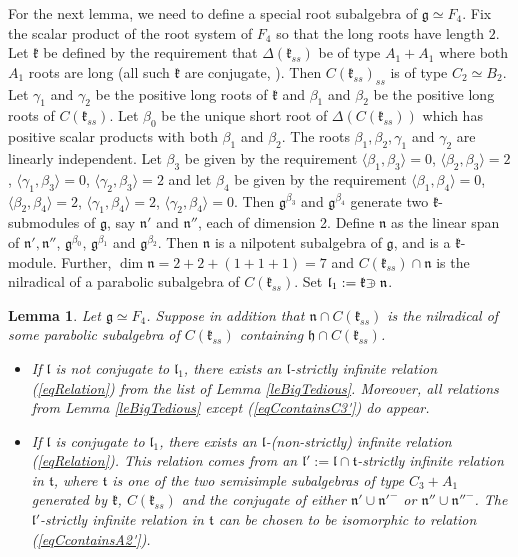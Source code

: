 \documentclass[12pt]{report}
\newtheorem{lemma}[theo]{Lemma}
\newcommand{\tT}{\mathfrak{t}}
\newcommand{\kk}{\mathfrak{k}}
\newcommand{\nn}{\mathfrak{n}}
\newcommand{\hh}{\mathfrak{h}}
\newcommand{\gG}{\mathfrak{g}}
\newcommand{\lL}{\mathfrak{l}}
\newcommand{\refeq}[1]{(\ref{#1})}
\def\crplus{\hbox{$\supset${\raise1.05pt\hbox{\kern -0.60em ${\scriptscriptstyle +}$}}\ }}
\begin{document}
For the next lemma, we need to define a special root subalgebra of $\gG\simeq F_4$. Fix the scalar product of the root system of $F_4$ so that the long roots have length $2$. Let $\kk$ be defined by the requirement that $\Delta(\kk_{ss})$ be of type $A_1+A_1$ where both $A_1$ roots are long (all such $\kk$ are conjugate, \cite{Dynkin:Semisimple}). Then $C(\kk_{ss})_{ss}$ is of type $C_2\simeq B_2$. Let $\gamma_1$ and $\gamma_2$ be the positive long roots of $\kk$ and $\beta_1$ and $\beta_2$ be the positive long roots of $C(\kk_{ss})$. Let $\beta_0$ be the unique short root of $\Delta(C(\kk_{ss}))$ which has positive scalar products with both $\beta_1$ and $\beta_2$. The roots $\beta_1,\beta_2,\gamma_1$ and $\gamma_2$ are linearly independent. Let $\beta_3$ be given by the requirement $\langle\beta_1,\beta_3 \rangle=0$, $\langle \beta_2, \beta_3 \rangle=2$, $\langle \gamma_1, \beta_3\rangle=0$, $\langle\gamma_2,\beta_3 \rangle=2$ and let $\beta_4$ be given by the requirement $\langle\beta_1,\beta_4 \rangle=0$, $\langle\beta_2,\beta_4\rangle=2$, $\langle \gamma_1, \beta_4 \rangle=2$, $\langle\gamma_2,\beta_4 \rangle=0$. Then $\gG^{\beta_3}$ and $\gG^{\beta_4}$ generate two $\kk$-submodules of $\gG$, say $\nn'$ and $\nn''$, each of dimension 2. Define $\nn$ as the linear span of $\nn',\nn''$, $\gG^{\beta_0}$, $\gG^{\beta_1}$ and $\gG^{\beta_2}$. Then $\nn$ is a nilpotent subalgebra of $\gG$, and is a $\kk$-module. Further, $\dim\nn = 2+2+(1+1+1)=7$ and $C(\kk_{ss})\cap\nn$ is the nilradical of a parabolic subalgebra of $C(\kk_{ss})$. Set $\lL_1:=\kk\crplus\nn$.  

\begin{lemma}\label{leF4} Let $\gG\simeq F_4$. Suppose in addition that $\nn \cap C(\kk_{ss})$ is the nilradical of some parabolic subalgebra of $C(\kk_{ss})$ containing $\hh\cap C(\kk_{ss})$.
\begin{itemize}
\item[(a)] If $\lL$ is not conjugate to $\lL_1$, there exists an $\lL$-strictly infinite relation \refeq{eqRelation} from the list of Lemma \ref{leBigTedious}. Moreover, all relations from Lemma \ref{leBigTedious} except (\ref{eqCcontainsC3'}) do appear.
\item[(b)] If $\lL$ is conjugate to $\lL_1$, there exists an $\lL$-(non-strictly) infinite relation \refeq{eqRelation}. This relation comes from an $\lL':=\lL\cap\tT$-strictly infinite relation in $\tT$, where $\tT$ is one of the two semisimple subalgebras of type $C_3+A_1$ generated by  $\kk$, $C(\kk_{ss})$ and the conjugate of either $\nn'\cup{\nn'}^-$ or $\nn''\cup{\nn''}^-$. The $\lL'$-strictly infinite relation in $\tT$ can be chosen to be isomorphic to relation (\ref{eqCcontainsA2'}).
 
\end{itemize}
\end{lemma}
\end{document}
